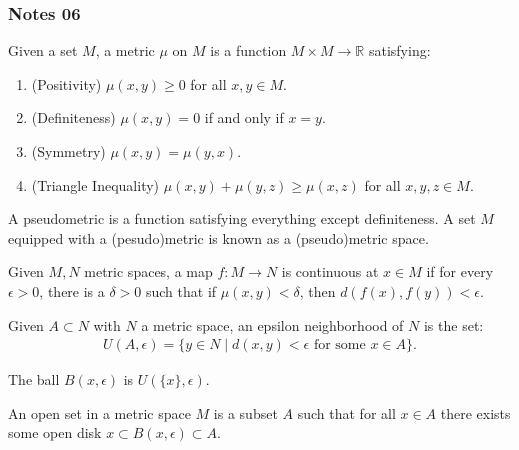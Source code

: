 \documentclass[12pt,letterpaper,reqno]{article}
\begin{document}
\subsubsection{Notes 06}

\begin{definition}[Metric]\label{def:metric}
    Given a set $M$, a metric $\mu$ on $M$ is a function $M \times M \to \mathbb{R}$ satisfying:
    \begin{enumerate}
        \item (Positivity) $\mu(x, y) \ge 0$ for all $x, y \in M$.
        \item (Definiteness) $\mu(x, y) = 0$ if and only if $x= y$.
        \item (Symmetry) $\mu(x, y) = \mu(y, x)$.
        \item (Triangle Inequality) $\mu(x, y) + \mu(y, z) \ge \mu(x, z)$ for all $x, y, z \in M$.
    \end{enumerate}
    A pseudometric is a function satisfying everything except definiteness. A set $M$ equipped with a (pesudo)metric is known as a (pseudo)metric space.
\end{definition}


\begin{definition}\label{def:continuity-metric}
    Given $M, N$ metric spaces, a map $f: M \to N$ is continuous at $x \in M$ if for every $\epsilon > 0$, there is a $\delta > 0$ such that if $\mu(x, y) < \delta$, then $d(f(x), f(y)) < \epsilon$.
\end{definition}

\begin{definition}\label{def:epsilon-neighborhood}
    Given $A \subset N$ with $N$ a metric space, an epsilon neighborhood of $N$ is the set:
    \begin{align*}
        U(A, \epsilon) = \{ y \in N \mid d(x, y) < \epsilon \text{ for some } x \in A \}.
    \end{align*}
\end{definition}

\begin{definition}\label{def:open-ball}
    The ball $B(x, \epsilon)$ is $U(\{x \}, \epsilon)$.
\end{definition}

\begin{definition}\label{def:open-set-metric}
    An open set in a metric space $M$ is a subset $A$ such that for all $x \in A$ there exists some open disk $x \subset B(x, \epsilon) \subset A$. 
\end{definition}
\end{document}
